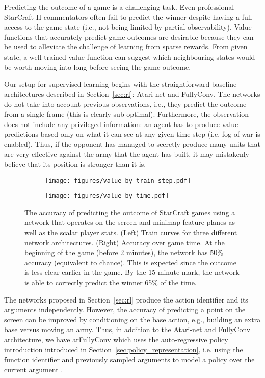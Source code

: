 \documentclass{article}
\begin{document}
Predicting the outcome of a game is a challenging task. Even professional StarCraft II commentators often fail to predict the winner despite having a full access to the game state (i.e., not being limited by partial observability). Value functions that accurately predict game outcomes are desirable because they can be used to alleviate the challenge of learning from sparse rewards. From given state, a well trained value function can suggest which neighbouring states would be worth moving into long before seeing the game outcome.

Our setup for supervised learning begins with the straightforward baseline architectures described in Section~\ref{sec:rl}: Atari-net and FullyConv. The networks do not take into account previous observations, i.e., they predict the outcome from a single frame (this is clearly sub-optimal). Furthermore, the observation does not include any privileged information: an agent has to produce value predictions based only on what it can see at any given time step (i.e. fog-of-war is enabled).  Thus, if the opponent has managed to secretly produce many units that are very effective against the army that the agent has built, it may mistakenly believe that its position is stronger than it is.

\begin{figure}[htp]
    \centering
    \begin{subfigure}{.5\textwidth}
      \centering
      \texttt{[image: figures/value\_by\_train\_step.pdf]}
    \end{subfigure}\begin{subfigure}{.5\textwidth}
      \centering
      \texttt{[image: figures/value\_by\_time.pdf]}
    \end{subfigure}
    \caption{The accuracy of predicting the outcome of StarCraft games using a network that operates on the screen and minimap feature planes as well as the scalar player stats. 
    (Left) Train curves for three different network architectures.
    (Right) Accuracy over game time. At the beginning of the game (before 2 minutes), the network has 50\% accuracy (equivalent to chance). This is expected since the outcome is less clear earlier in the game. By the 15 minute mark, the network is able to correctly predict the winner 65\% of the time.}
    \label{fig:value}
\end{figure}

The networks proposed in Section~\ref{sec:rl} produce the action identifier and its arguments independently. However, the accuracy of predicting a point on the screen can be improved by conditioning on the base action, e.g., building an extra base versus moving an army. Thus, in addition to the Atari-net and FullyConv architecture, we have arFullyConv which uses the auto-regressive policy introduction introduced in Section~\ref{sec:policy_representation}, i.e. using the function identifier  and previously sampled arguments  to model a policy over the current argument .
\end{document}
